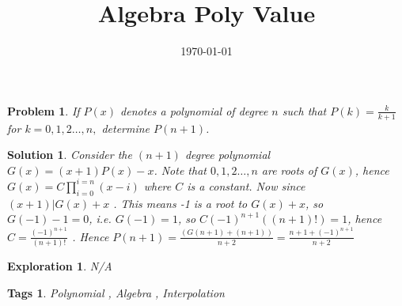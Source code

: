 \documentclass{article}
\title{Algebra Poly Value}
\date{\today}
\newtheorem*{problem}{Problem}
\newtheorem*{solution}{Solution}
\newtheorem*{exploration}{Exploration}
\newtheorem*{tags}{Tags}
\begin{document}
	
	\maketitle
	
	\begin{problem}
		If $P(x)$ denotes a polynomial of degree $n$ such that $P(k)=\frac{k}{k+1}$ for $k=0,1,2 \dots , n,$ determine $P(n+1)$.
	\end{problem}
	
	\begin{solution}
		Consider the $(n+1)$ degree polynomial $G(x)=(x+1)P(x) - x$. Note that $0,1,2 \dots ,n$ are roots of $G(x)$, hence $G(x)= C \prod_{i=0}^{i=n} (x-i) $ where $C$ is a constant. Now since $(x+1)| G(x)+x$ . This means -1 is a root to $G(x)+x$, so $G(-1)-1=0$, i.e. $G(-1)=1$, so 
		$C(-1)^{n+1} ((n+1)!)=1$, hence $C=\frac{(-1)^{n+1}}{(n+1)!}$ . Hence $P(n+1) = \frac{(G(n+1) + (n+1))}{n+2} = \frac{n+1 +(-1)^{n+1}}{n+2}$
	\end{solution}
	
	\begin{exploration}
		N/A
	\end{exploration}
	
	\begin{tags}
		Polynomial ,  Algebra , Interpolation
	\end{tags}
	
\end{document}
